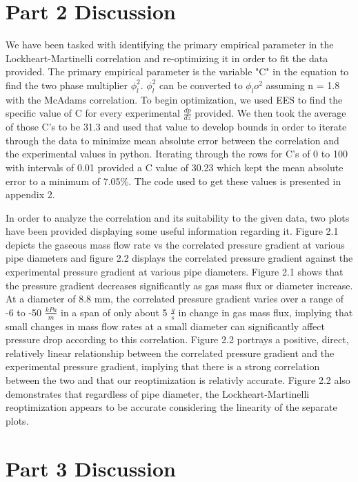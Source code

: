\documentclass[10pt]{article}
\begin{document}
\section{Part 2 Discussion}
\par
We have been tasked with identifying the primary empirical parameter in the Lockheart-Martinelli correlation and re-optimizing it in order to fit the data provided. The primary empirical parameter is the variable "C" in the equation to find the two phase multiplier $\phi_l^2$. $\phi_l^2$ can be converted to $\phi_lo^2$ assuming n = 1.8 with the McAdams correlation. To begin optimization, we used EES to find the specific value of C for every 
experimental $\frac{dp}{dz}$ provided. We then took the average of those C's to be 31.3 and used that value to develop bounds in order to iterate through the data  to minimize mean absolute error between the correlation and the experimental values in python. Iterating through the rows for C's of 0 to 100 with intervals of  0.01 provided a C value of 30.23 which kept the mean absolute error to a minimum of 7.05\%. The code used to get these values is presented in appendix 2.
\par
In order to analyze the correlation and its suitability to the given data, two plots have been provided displaying some useful information regarding it. 
Figure 2.1 depicts the gaseous mass flow rate vs the correlated pressure gradient at various pipe diameters and figure 2.2 displays the correlated pressure gradient
against the experimental pressure gradient at various pipe diameters. Figure 2.1 shows that the pressure gradient decreases significantly as gas mass flux or 
diameter increase. At a diameter of 8.8 mm, the correlated pressure gradient varies over a range of -6 to -50 $\frac{kPa}{m}$ in a span of only about 5 $\frac{g}{s}$ in change in gas mass flux, implying that small changes in mass flow rates at a small diameter can significantly affect pressure drop according to this correlation. Figure 2.2 portrays a positive, direct, relatively linear relationship between the correlated pressure gradient and the experimental pressure gradient, implying that there is a strong correlation between the two and that our reoptimization is relativly accurate. Figure 2.2 also demonstrates that regardless 
of pipe diameter, the Lockheart-Martinelli reoptimization appears to be accurate considering the linearity of the separate plots. 

\section{Part 3 Discussion}
\end{document}
